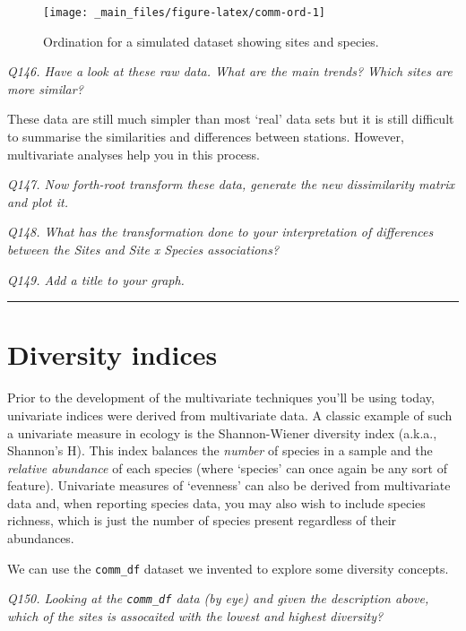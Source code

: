 \documentclass[
  11pt,
  a4paper,
]{book}
\begin{document}
\begin{figure}

{\centering \texttt{[image: \_main\_files/figure-latex/comm-ord-1]} 

}

\caption{Ordination for a simulated dataset showing sites and species.}\label{fig:comm-ord}
\end{figure}

\emph{Q146. Have a look at these raw data. What are the main trends? Which sites are more similar?}

These data are still much simpler than most `real' data sets but it is still difficult to summarise the similarities and differences between stations. However, multivariate analyses help you in this process.

\emph{Q147. Now forth-root transform these data, generate the new dissimilarity matrix and plot it.}

\emph{Q148. What has the transformation done to your interpretation of differences between the Sites and Site x Species associations?}

\emph{Q149. Add a title to your graph.}

\begin{center}\rule{0.5\linewidth}{0.5pt}\end{center}

\hypertarget{diversity-indices}{%
\section{Diversity indices}\label{diversity-indices}}

Prior to the development of the multivariate techniques you'll be using today, univariate indices were derived from multivariate data. A classic example of such a univariate measure in ecology is the Shannon-Wiener diversity index (a.k.a., Shannon's H). This index balances the \emph{number} of species in a sample and the \emph{relative abundance} of each species (where `species' can once again be any sort of feature). Univariate measures of `evenness' can also be derived from multivariate data and, when reporting species data, you may also wish to include species richness, which is just the number of species present regardless of their abundances.

We can use the \texttt{comm\_df} dataset we invented to explore some diversity concepts.

\emph{Q150. Looking at the \texttt{comm\_df} data (by eye) and given the description above, which of the sites is assocaited with the lowest and highest diversity?}
\end{document}
